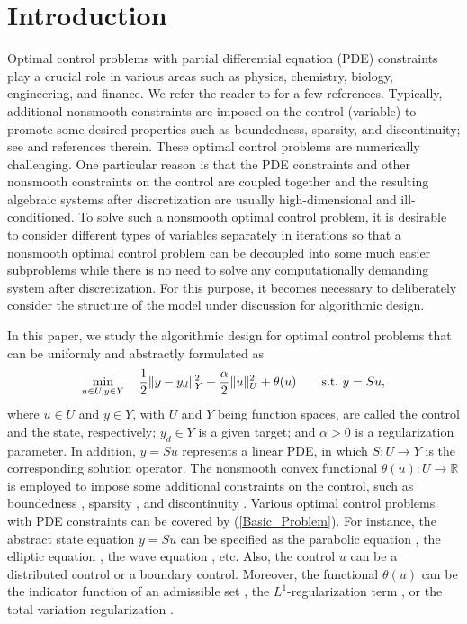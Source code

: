 \documentclass[final]{siamart171218}
\theoremstyle{remark}
\begin{document}
\section{Introduction}
Optimal control problems with partial differential equation (PDE) constraints  play a crucial role in various areas such as
physics, chemistry, biology, engineering, and finance. We refer the reader to \cite{glowinski1994exact, glowinski1995exact, glowinski2008exact, hinze2008optimization, lions1971optimal, troltzsch2010optimal} for a few references. Typically, additional nonsmooth constraints are imposed on the control (variable) to promote some desired properties such as boundedness, sparsity, and discontinuity; see  \cite{elvetun2016,kunisch2004,lions1971optimal,stadler2009elliptic,troltzsch2010optimal} and references therein. These optimal control problems are numerically challenging. One particular reason is that the PDE constraints and other nonsmooth constraints on the control are coupled together and  the resulting algebraic systems after discretization are usually high-dimensional and ill-conditioned. To solve such a nonsmooth optimal control problem, it is desirable to consider different types of variables separately in iterations so that a nonsmooth optimal control problem can be decoupled into some much easier subproblems while there is no need to solve any computationally demanding system after discretization. For this purpose, it becomes necessary to deliberately consider the structure of the model under discussion for algorithmic design.

In this paper, we study the algorithmic design for optimal control problems that can be uniformly and abstractly formulated as
\begin{equation}\label{Basic_Problem}
		\min_{u\in {U}, y\in {Y}} \quad   \frac{1}{2}\| y-y_d \|^2_Y+\frac{\alpha}{2}\|u\|_U^2+ \theta(u) \\\qquad
		{\hbox{s.t.}}~  y=Su,
\end{equation}
    where $u\in U$ and $y\in Y$, with $U$ and $Y$ being function spaces, are called the control and the state, respectively; $y_d\in Y$ is a given target; and $\alpha>0$ is a regularization parameter. In addition, $y=Su$ represents a linear PDE, in which $S: U\rightarrow Y$ is the corresponding solution operator. The nonsmooth convex functional $\theta(u): U\rightarrow\mathbb{R}$ is employed to impose some additional constraints on the control, such as boundedness \cite{lions1971optimal,troltzsch2010optimal}, sparsity \cite{stadler2009elliptic}, and discontinuity \cite{elvetun2016}. Various optimal control problems with PDE constraints can be covered by (\ref{Basic_Problem}). For instance, the abstract state equation $y=Su$ can be specified as the parabolic equation \cite{glowinski1994exact}, the elliptic equation \cite{hintermuller2002primal}, the wave equation \cite{glowinski1995exact}, etc. Also, the control $u$ can be a distributed control or a boundary control. Moreover, the functional $\theta(u)$ can be the indicator function of an admissible set \cite{glowinski2022}, the $L^1$-regularization term \cite{stadler2009elliptic}, or the total variation regularization \cite{elvetun2016,kunisch2004}.
\end{document}
